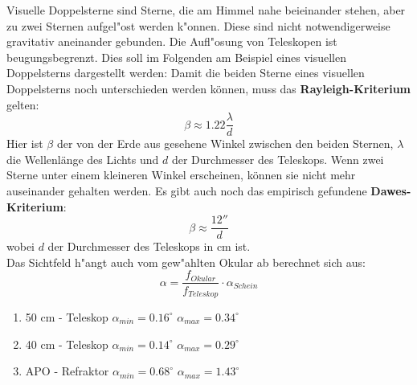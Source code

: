 Visuelle Doppelsterne sind Sterne, die am Himmel nahe beieinander stehen, aber zu zwei Sternen aufgel"ost werden k"onnen. Diese sind nicht notwendigerweise gravitativ aneinander gebunden. 
Die Aufl"osung von Teleskopen ist beugungsbegrenzt. Dies soll im Folgenden am Beispiel eines visuellen Doppelsterns dargestellt werden:
Damit die beiden Sterne eines visuellen Doppelsterns noch unterschieden werden können, muss das \textbf{Rayleigh-Kriterium} gelten:
\begin{equation}
\beta \approx 1.22\frac{\lambda}{d}
\end{equation}
Hier ist $\beta$ der von der Erde aus gesehene Winkel zwischen den beiden Sternen, $\lambda$ die Wellenlänge des Lichts und $d$ der Durchmesser des Teleskops. Wenn zwei Sterne unter einem kleineren Winkel erscheinen, können sie nicht mehr auseinander gehalten werden.
Es gibt auch noch das empirisch gefundene \textbf{Dawes-Kriterium}:
\begin{equation}
\beta \approx \frac{12''}{d}
\end{equation}
wobei $d$ der Durchmesser des Teleskops in cm ist.
\\
Das Sichtfeld h"angt auch vom gew"ahlten Okular ab berechnet sich aus:
\begin{equation}
\alpha = \frac{f_{Okular}}{f_{Teleskop}}\cdot \alpha_{Schein}
\end{equation}
\begin{enumerate}
\item
50 cm - Teleskop
$\alpha_{min} = 0.16^{\circ}$
$\alpha_{max} = 0.34^{\circ}$
\item
40 cm - Teleskop
$\alpha_{min} = 0.14^{\circ}$
$\alpha_{max} = 0.29^{\circ}$
\item
APO - Refraktor
$\alpha_{min} = 0.68^{\circ}$
$\alpha_{max} = 1.43^{\circ}$
\end{enumerate}

